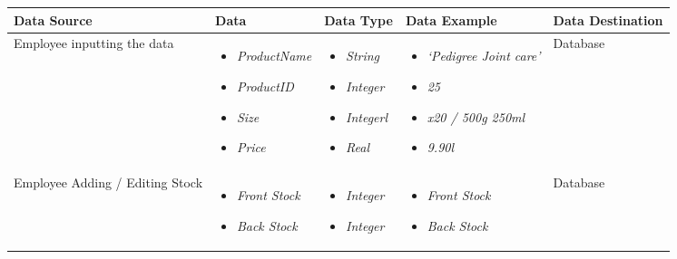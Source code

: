 \begin{center}
    \begin{tabular}{|p{2cm}|p{3cm}|p{2cm}|p{3cm}|p{3cm}|}
        \hline
        \textbf{Data Source} & \textbf{Data} & \textbf{Data Type} & \textbf{Data Example} & \textbf{Data Destination}\\ \hline
        
          Employee inputting the data
         & \begin{itemize}
        		\item \textit{ProductName}
        		\item  \textit{ProductID}
        		\item  \textit{Size}
        		\item \textit{Price} 
	\end{itemize}
	& \begin{itemize}
        		\item \textit{String}
        		\item  \textit{Integer}
        		\item  \textit{Integerl}
        		\item \textit{Real} 
	\end{itemize}
         & \begin{itemize}
        		\item \textit{`Pedigree Joint care'}
        		\item  \textit{ 25}
        		\item  \textit{ x20 / 500g 250ml}
        		\item \textit{9.90l} 
	\end{itemize}
	& Database \\ \hline
	Employee Adding / Editing Stock
         & \begin{itemize}
        		\item \textit{Front Stock}
        		\item  \textit{Back Stock}
	\end{itemize}
	& \begin{itemize}
        		\item \textit{Integer}
        		\item  \textit{Integer}
	\end{itemize}
         & \begin{itemize}
        		\item \textit{Front Stock}
        		\item  \textit{Back Stock}
	\end{itemize}
	& Database \\ \hline

\end{tabular}
\end{center}
